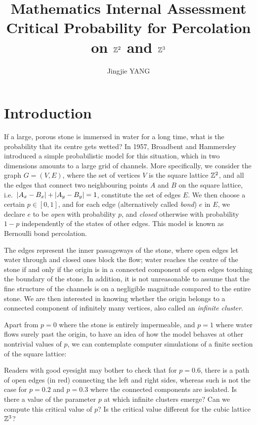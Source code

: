 \documentclass[a4paper, 12pt]{article}
\title{
\textbf{Mathematics Internal Assessment}\\
\bigskip
Critical Probability for Percolation on $\mathbb{Z}^2$ and $\mathbb{Z}^3$
}
\author{Jingjie YANG}
\date{}
\begin{document}
\maketitle


\section{Introduction}\label{ch:intro}
If a large, porous stone is immersed in water for a long time, what is the probability that its centre gets wetted? In 1957, Broadbent and Hammersley \autocite*[693]{broadbent_hammersley_1957} introduced a simple probabilistic model for this situation, which in two dimensions amounts to a large grid of channels. More specifically, we consider the graph $G = (V, E)$, where the set of vertices $V$ is the square lattice $\mathbb{Z}^2$, and all the edges that connect two neighbouring points $A$ and $B$ on the square lattice, i.e.\ $\lvert A_x - B_x \rvert + \lvert A_y - B_y \rvert = 1$, constitute the set of edges $E$. We then choose a certain $p \in [0, 1]$, and for each edge (alternatively called \textit{bond}) $e$ in $E$, we declare $e$ to be \textit{open} with probability $p$, and \textit{closed} otherwise with probability $1 - p$ independently of the states of other edges. This model is known as Bernoulli bond percolation. 



The edges represent the inner passageways of the stone, where open edges let water through and closed ones block the flow; water reaches the centre of the stone if and only if the origin is in a connected component of open edges touching the boundary of the stone. In addition, it is not unreasonable to assume that the fine structure of the channels is on a negligible magnitude compared to the entire stone. We are then interested in knowing whether the origin belongs to a connected component of infinitely many vertices, also called an \textit{infinite cluster}. 

Apart from $p = 0$ where the stone is entirely impermeable, and $p = 1$ where water flows surely past the origin, to have an idea of how the model behaves at other nontrivial values of $p$, we can contemplate computer simulations of a finite section of the square lattice:


\break

Readers with good eyesight may bother to check that for $p = 0.6$, there is a path of open edges (in red) connecting the left and right sides, whereas such is not the case for $p = 0.2$ and $p = 0.3$ where the connected components are isolated. Is there a value of the parameter $p$ at which infinite clusters emerge? Can we compute this critical value of $p$? Is the critical value different for the cubic lattice $\mathbb{Z}^3$? 
\end{document}
